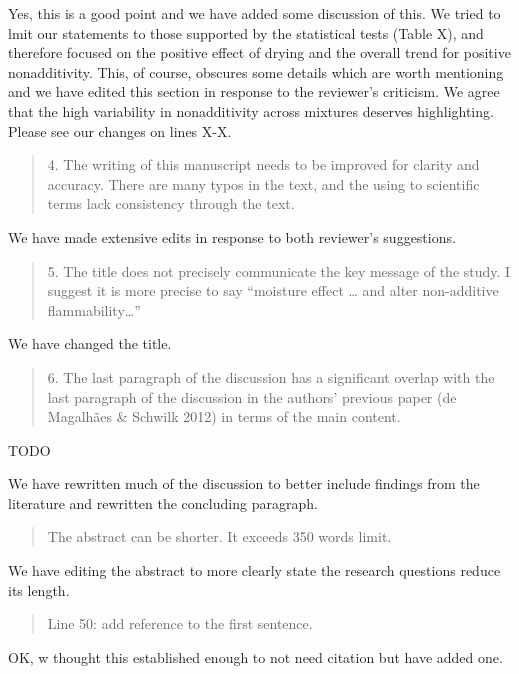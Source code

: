 \documentclass[letterpaper, 12pt]{letter}
\begin{document}
\begin{letter}{}
Yes, this is a good point and we have added some discussion of this.  We tried to lmit our statements to those supported by the statistical tests (Table X), and therefore focused on the positive effect of drying and the overall trend for positive nonadditivity. This, of course, obscures some details which are worth mentioning and we have edited this section in response to the reviewer's criticism. We agree that the high variability in nonadditivity across mixtures deserves highlighting. Please see our changes on lines X-X.


\begin{quote}
4. The writing of this manuscript needs to be improved for clarity and accuracy. There are many typos in the text, and the using to scientific terms lack consistency through the text.
\end{quote}

We have made extensive edits in response to both reviewer's suggestions.

\begin{quote}
5. The title does not precisely communicate the key message of the study. I suggest it is more precise to say “moisture effect … and alter non-additive flammability…”
\end{quote}

We have changed the title.

\begin{quote}
6. The last paragraph of the discussion has a significant overlap with the last paragraph of the discussion in the authors’ previous paper (de Magalhães \& Schwilk 2012) in terms of the main content.
\end{quote}

TODO

We have rewritten much of the discussion to better include findings from the literature and rewritten the concluding paragraph. 

\begin{quote}
The abstract can be shorter. It exceeds 350 words limit. 
\end{quote}

We have editing the abstract to more clearly state the research questions reduce its length.

\begin{quote}
Line 50: add reference to the first sentence.
\end{quote}

OK, w thought this established enough to not need citation but have added one.


\end{letter}
\end{document}
